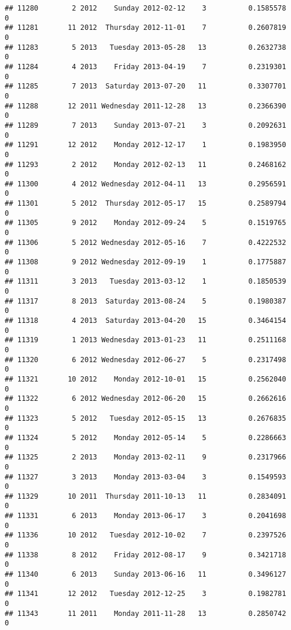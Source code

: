 \documentclass[
]{article}
\begin{document}
\begin{verbatim}
## 11280        2 2012    Sunday 2012-02-12    3          0.1585578             0
## 11281       11 2012  Thursday 2012-11-01    7          0.2607819             0
## 11283        5 2013   Tuesday 2013-05-28   13          0.2632738             0
## 11284        4 2013    Friday 2013-04-19    7          0.2319301             0
## 11285        7 2013  Saturday 2013-07-20   11          0.3307701             0
## 11288       12 2011 Wednesday 2011-12-28   13          0.2366390             0
## 11289        7 2013    Sunday 2013-07-21    3          0.2092631             0
## 11291       12 2012    Monday 2012-12-17    1          0.1983950             0
## 11293        2 2012    Monday 2012-02-13   11          0.2468162             0
## 11300        4 2012 Wednesday 2012-04-11   13          0.2956591             0
## 11301        5 2012  Thursday 2012-05-17   15          0.2589794             0
## 11305        9 2012    Monday 2012-09-24    5          0.1519765             0
## 11306        5 2012 Wednesday 2012-05-16    7          0.4222532             0
## 11308        9 2012 Wednesday 2012-09-19    1          0.1775887             0
## 11311        3 2013   Tuesday 2013-03-12    1          0.1850539             0
## 11317        8 2013  Saturday 2013-08-24    5          0.1980387             0
## 11318        4 2013  Saturday 2013-04-20   15          0.3464154             0
## 11319        1 2013 Wednesday 2013-01-23   11          0.2511168             0
## 11320        6 2012 Wednesday 2012-06-27    5          0.2317498             0
## 11321       10 2012    Monday 2012-10-01   15          0.2562040             0
## 11322        6 2012 Wednesday 2012-06-20   15          0.2662616             0
## 11323        5 2012   Tuesday 2012-05-15   13          0.2676835             0
## 11324        5 2012    Monday 2012-05-14    5          0.2286663             0
## 11325        2 2013    Monday 2013-02-11    9          0.2317966             0
## 11327        3 2013    Monday 2013-03-04    3          0.1549593             0
## 11329       10 2011  Thursday 2011-10-13   11          0.2834091             0
## 11331        6 2013    Monday 2013-06-17    3          0.2041698             0
## 11336       10 2012   Tuesday 2012-10-02    7          0.2397526             0
## 11338        8 2012    Friday 2012-08-17    9          0.3421718             0
## 11340        6 2013    Sunday 2013-06-16   11          0.3496127             0
## 11341       12 2012   Tuesday 2012-12-25    3          0.1982781             0
## 11343       11 2011    Monday 2011-11-28   13          0.2850742             0

\end{verbatim}
\end{document}
